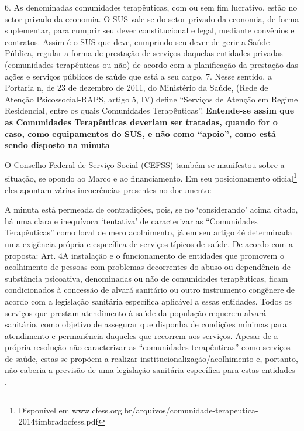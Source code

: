 \documentclass[
	12pt,				%
	oneside,			%
	a4paper,			%
	sumario=tradicional,
	english,			%
	brazil				%
	]{abntex2}
\begin{document}
\begin{quoting}[rightmargin=0cm,leftmargin=4cm]
\begin{singlespace}
{\footnotesize
6.  As denominadas comunidades terapêuticas, com ou sem fim lucrativo, estão no setor privado da economia. O SUS vale-se do setor privado da economia, de forma suplementar, para cumprir seu dever constitucional e legal, mediante convênios e contratos. Assim é o SUS que deve, cumprindo seu dever de gerir a Saúde Pública, regular a forma de prestação de serviços daquelas entidades privadas (comunidades terapêuticas ou não) de acordo com a planificação da prestação das ações e serviços públicos de saúde que está a seu cargo.
7.  Nesse sentido, a Portaria n, de 23 de dezembro de 2011, do Ministério da Saúde, (Rede de Atenção Psicossocial-RAPS, artigo 5\textordmasculine, IV) define “Serviços de Atenção em Regime Residencial, entre os quais Comunidades Terapêuticas”. \textbf{Entende-se assim que as Comunidades Terapêuticas deveriam ser tratadas, quando for o caso, como equipamentos do SUS, e não como “apoio”, como está sendo disposto na minuta} \cite[p. 02, grifo meu]{pfdc2015}}
\end{singlespace}
\end{quoting}
O Conselho Federal de Serviço Social (CEFSS) também se manifestou sobre a situação, se opondo ao Marco e ao financiamento. Em seu posicionamento oficial\footnote{Disponível em www.cfess.org.br/arquivos/comunidade-terapeutica-2014timbradocfess.pdf} eles apontam várias incoerências presentes no documento:
\begin{quoting}[rightmargin=0cm,leftmargin=4cm]
\begin{singlespace}
{\footnotesize
A minuta está permeada de contradições, pois, se no ‘considerando’ acima citado, há uma clara e inequívoca ‘tentativa’ de caracterizar as “Comunidades Terapêuticas” como local de mero acolhimento, já em seu artigo 4\textordmasculine é determinada uma exigência própria e específica de serviços típicos de saúde. De acordo com a proposta: 
Art. 4\textordmasculine A instalação e o funcionamento de entidades que promovem o acolhimento de pessoas com problemas decorrentes do abuso ou dependência de substância psicoativa, denominadas ou não de comunidades terapêuticas, ficam condicionados à concessão de alvará sanitário ou outro instrumento congênere de acordo com a legislação sanitária específica aplicável a essas entidades. 
Todos os serviços que prestam atendimento à saúde da população requerem alvará sanitário, como objetivo de assegurar que disponha de condições mínimas para atendimento e permanência daqueles que recorrem aos serviços. Apesar de a própria resolução não caracterizar as “comunidades terapêuticas” como serviços de saúde, estas se propõem a realizar institucionalização/acolhimento e, portanto, não caberia a previsão de uma legislação sanitária específica para estas entidades \cite[p.03]{cfess2014}.}
\end{singlespace}
\end{quoting}
\end{document}
